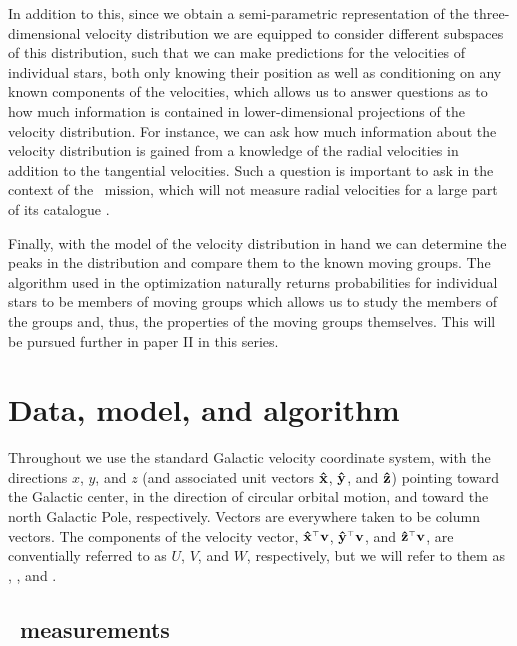 In addition to this, since we obtain a semi-parametric representation
of the three-dimensional velocity distribution we are equipped to
consider different subspaces of this distribution, such that we can
make predictions for the velocities of individual stars, both only
knowing their position as well as conditioning on any known components
of the velocities, which allows us to answer questions as to how much
information is contained in lower-dimensional projections of the
velocity distribution. For instance, we can ask how much information
about the velocity distribution is gained from a knowledge of the
radial velocities in addition to the tangential velocities. Such a
question is important to ask in the context of the \Gaia\ mission,
which will not measure radial velocities for a large part of its
catalogue \citep{2001A&A...369..339P}.

Finally, with the model of the velocity distribution in hand we can
determine the peaks in the distribution and compare them to the known
moving groups. The algorithm used in the optimization naturally
returns probabilities for individual stars to be members of moving
groups which allows us to study the members of the groups and, thus,
the properties of the moving groups themselves. This will be pursued
further in paper II in this series.



\section{Data, model, and algorithm}\label{sec:modelveldist}

Throughout we use the standard Galactic velocity coordinate system,
with the directions $x$, $y$, and $z$ (and associated unit vectors
$\mathbf{\hat{x}}$, $\mathbf{\hat{y}}$, and $\mathbf{\hat{z}}$) pointing toward the Galactic center, in
the direction of circular orbital motion, and toward the north
Galactic Pole, respectively. Vectors are everywhere taken to be column
vectors. The components of the velocity vector, $\mathbf{\hat{x}}^{\scriptscriptstyle \top}\boldsymbol{\mathbf{v}}$,
$\mathbf{\hat{y}}^{\scriptscriptstyle \top}\boldsymbol{\mathbf{v}}$, and $\mathbf{\hat{z}}^{\scriptscriptstyle \top}\boldsymbol{\mathbf{v}}$, are conventially referred to as $U$,
$V$, and $W$, respectively, but we will refer to them as \vx, \vy, and
\vz.

\subsection{\Hipparcos\ measurements}


